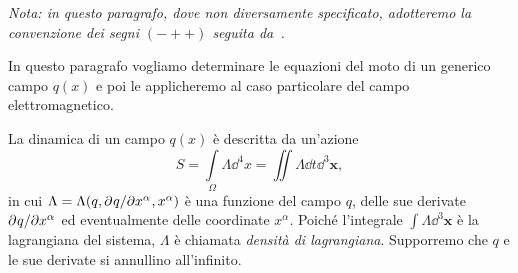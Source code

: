 \emph{Nota: in questo paragrafo, dove non diversamente specificato, adotteremo
  la convenzione dei segni $(-++)$ seguita
  da~\textcites{barone:relativita,landau:campi}.}

In questo paragrafo vogliamo determinare le equazioni del moto di un generico
campo $q(x)$ e poi le applicheremo al caso particolare del campo
elettromagnetico.

La dinamica di un campo $q(x)$ è descritta da un'azione
\begin{equation}
  \label{eq:azione-campo}
  S = \int\limits_{\Omega} \Lambda\dd^{4} x = \iint \Lambda \dd t\dd^{3} \bm{x},
\end{equation}
in cui $\Lambda = \Lambda(q, \partial^{} q / \partial {x^{\alpha}}^{}, x^{\alpha})$ è una
funzione del campo $q$, delle sue derivate $\partial^{} q / \partial {x^{\alpha}}^{}$ ed
eventualmente delle coordinate $x^{\alpha}$.  Poiché l'integrale
$\int \Lambda\dd^{3} \bm{x}$ è la lagrangiana del sistema, $\Lambda$ è chiamata
\emph{densità di lagrangiana}.  Supporremo che $q$
e le sue derivate si annullino all'infinito.

